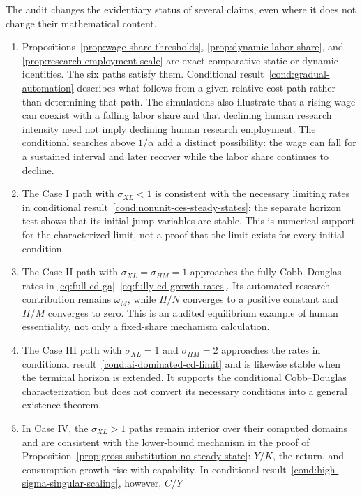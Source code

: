 The audit changes the evidentiary status of several claims, even where it does not
change their mathematical content.
\begin{enumerate}[label=(\roman*)]
    \item Propositions~\ref{prop:wage-share-thresholds},
    \ref{prop:dynamic-labor-share}, and
    \ref{prop:research-employment-scale} are exact comparative-static or dynamic
    identities. The six paths satisfy them. Conditional
    result~\ref{cond:gradual-automation} describes what follows from a given
    relative-cost path rather than determining that path. The simulations also
    illustrate that a rising wage
    can coexist with a falling labor share and that declining human research
    intensity need not imply declining human research employment. The conditional
    searches above $1/\alpha$ add a distinct possibility: the wage can fall for a
    sustained interval and later recover while the labor share continues to decline.
    \item The Case I path with $\sigma_{XL}<1$ is consistent with the necessary limiting rates
    in conditional result~\ref{cond:nonunit-ces-steady-states}; the separate horizon test
    shows that its initial jump variables are stable. This is numerical support for
    the characterized limit, not a proof that the limit exists for every initial
    condition.
    \item The Case II path with $\sigma_{XL}=\sigma_{HM}=1$ approaches the fully Cobb--Douglas
    rates in \eqref{eq:full-cd-ga}--\eqref{eq:fully-cd-growth-rates}. Its automated
    research contribution remains $\omega_M$, while $H/N$ converges to a positive
    constant and $H/M$ converges to zero. This is an audited equilibrium example of
    human essentiality, not only a fixed-share mechanism calculation.
    \item The Case III path with $\sigma_{XL}=1$ and $\sigma_{HM}=2$ approaches the
    rates in conditional result~\ref{cond:ai-dominated-cd-limit} and is likewise
    stable when the terminal horizon is extended. It supports the conditional
    Cobb--Douglas characterization but does not convert its necessary conditions
    into a general existence theorem.
    \item In Case IV, the $\sigma_{XL}>1$ paths remain interior over their computed domains
    and are consistent with the lower-bound mechanism in the proof of
    Proposition~\ref{prop:gross-substitution-no-steady-state}: $Y/K$, the return, and
    consumption growth rise with capability. In conditional
    result~\ref{cond:high-sigma-singular-scaling}, however, $C/Y$

\end{enumerate}
